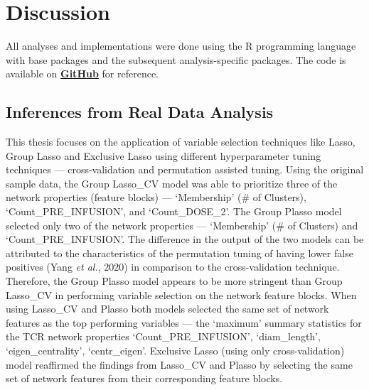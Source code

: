 \chapter{Discussion}
All analyses and implementations were done using the R programming language with base packages and the subsequent analysis-specific packages. The code is available on \href{https://github.com/ShilpikaB/Prioritizing-Network-Properties-of-T-Cell-Receptors}{\textbf{GitHub}} for reference.
\section{Inferences from Real Data Analysis}\label{sec:realdat_ana}
This thesis focuses on the application of variable selection techniques like Lasso, Group Lasso and Exclusive Lasso using different hyperparameter tuning techniques --- cross-validation and permutation assisted tuning. Using the original sample data, the Group Lasso\_CV model was able to prioritize three of the network properties (feature blocks) --- \lq Membership' (\# of Clusters), \lq Count\_PRE\_INFUSION', and \lq Count\_DOSE\_2'. The Group Plasso model selected only two of the network properties --- \lq Membership' (\# of Clusters) and \lq Count\_PRE\_INFUSION'. The difference in the output of the two models can be attributed to the characteristics of the permutation tuning of having lower false positives (\cite{permassisttune}Yang \textit{et al.}, 2020) in comparison to the cross-validation technique. Therefore, the Group Plasso model appears to be more stringent than Group Lasso\_CV in performing variable selection on the network feature blocks. When using Lasso\_CV and Plasso both models selected the same set of network features as the top performing variables --- the \lq maximum' summary statistics for the TCR network properties \lq Count\_PRE\_INFUSION', \lq diam\_length', \lq eigen\_centrality', \lq centr\_eigen'. Exclusive Lasso (using only cross-validation) model reaffirmed the findings from Lasso\_CV and Plasso by selecting the same set of network features from their corresponding feature blocks.\par


